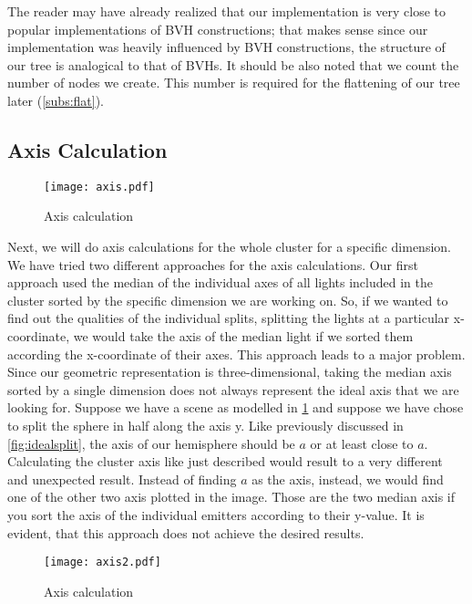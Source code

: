 The reader may have already realized that our implementation is very close to popular implementations of BVH constructions; that makes sense since our implementation was heavily influenced by BVH constructions, the structure of our tree is analogical to that of BVHs. It should be also noted that we count the number of nodes we create. This number is required for the flattening of our tree later (\ref{subs:flat}).

\subsection{Axis Calculation}
\label{subs:axis}

\begin{figure}
	\begin{center}
		\texttt{[image: axis.pdf]}
		\caption{Axis calculation}
		\label{fig:axis}
	\end{center}
\end{figure}

Next, we will do axis calculations for the whole cluster for a specific dimension. We have tried two different approaches for the axis calculations. Our first approach used the median of the individual axes of all lights included in the cluster sorted by the specific dimension we are working on. So, if we wanted to find out the qualities of the individual splits, splitting the lights at a particular x-coordinate, we would take the axis of the median light if we sorted them according the x-coordinate of their axes. This approach leads to a major problem. Since our geometric representation is three-dimensional, taking the median axis sorted by a single dimension does not always represent the ideal axis that we are looking for. Suppose we have a scene as modelled in \ref{fig:axis} and suppose we have chose to split the sphere in half along the axis y. Like previously discussed in \ref{fig:idealsplit}, the axis of our hemisphere should be $a$ or at least close to $a$. Calculating the cluster axis like just described would result to a very different and unexpected result. Instead of finding $a$ as the axis, instead, we would find one of the other two axis plotted in the image. Those are the two median axis if you sort the axis of the individual emitters according to their y-value. It is evident, that this approach does not achieve the desired results. 

\begin{figure}
	\begin{center}
		\texttt{[image: axis2.pdf]}
		\caption{Axis calculation}
		\label{fig:axis2}
	\end{center}
\end{figure}


